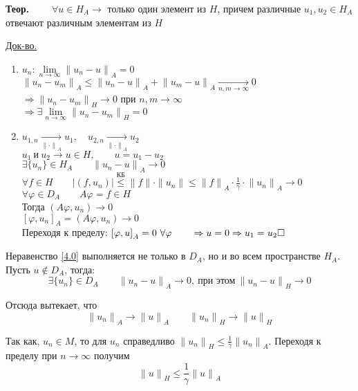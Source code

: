 \documentclass[12pt, a4paper]{article}
\begin{document}
\textbf{Теор.} $ \qquad \forall u \in H_A \rightarrow $ только один элемент из $H$, причем различные $u_1, u_2 \in H_A$ отвечают различным элементам из $H$

\underline{Док-во.}

\begin{enumerate}
	\item
	$ {u_n}: \lim\limits_{n \rightarrow \infty} {\|u_n - u\|}_A = 0 $ \\
	$ {\|u_n - u_m\|}_A \leq {\|u_n - u\|}_A + {\|u_m - u\|}_A \underset{n,m \rightarrow \infty}{\rightarrow} 0 $ \\
	$ \Rightarrow {\|u_n - u_m\|}_H \rightarrow 0 $ при $ n,m \rightarrow \infty $ \\
	$ \Rightarrow \exists \lim\limits_{n \rightarrow \infty} {\|u_n - u_m\|}_H = 0 $

	\item
	$ u_{1, n} \underset{{\|\cdot\|}_A}{\rightarrow}  u_1, \quad u_{2, n} \underset{{\|\cdot\|}_A}{\rightarrow}  u_2 $ \\
	$ u_1 \ \text{и} \ u_2 \rightarrow u \in H, \qquad u = u_1 - u_2$ \\
	$ \exists \{u_n\} \in H_A \qquad {\|u_n - u\|}_A \rightarrow 0 $ \\
	$ \forall f \in H \qquad |(f, u_n)| \overset{\text{КБ}}{\leq} \|f\|\cdot\|u_n\| \leq {\|f\|}_A\cdot\frac{1}{\gamma}\cdot{\|u_n\|}_A \rightarrow 0 $ \\
	$ \forall \varphi \in D_A \qquad A\varphi = f \in H $ \\
	Тогда $ (A\varphi, u_n) \rightarrow 0 $ \\
	$ {[\varphi, u_n]}_A = (A\varphi, u_n) \rightarrow 0 $ \\
	Переходя к пределу: $ {[\varphi, u]}_A = 0 \ \forall \varphi \qquad \Rightarrow u = 0 \Rightarrow u_1 = u_2 \hfill \square $
\end{enumerate}

Неравенство \eqref{4.0} выполняется не только в $D_A$, но и во всем пространстве $H_A$. Пусть $u \notin D_A$, тогда:
\[ \exists \{u_n\} \in D_A \qquad {\|u_n - u\|}_A \rightarrow 0, \ \text{при этом} \ {\|u_n - u\|}_H \rightarrow 0 \]

Отсюда вытекает, что
\[ {\|u_n\|}_A \rightarrow {\|u\|}_A \qquad {\|u_n\|}_H \rightarrow {\|u\|}_H \]

Так как, $u_n \in M$, то для $u_n$ справедливо ${\|u_n\|}_H \leq \frac{1}{\gamma} {\|u_n\|}_A$. Переходя к пределу при $n \rightarrow \infty$ получим
\[ {\|u\|}_H \leq \frac{1}{\gamma} {\|u\|}_A \] \\ \\
\end{document}
